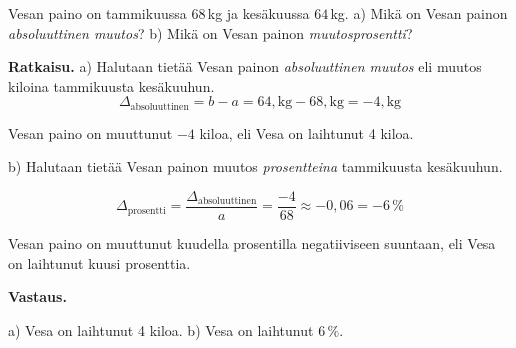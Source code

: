 \begin{esimerkki}
    Vesan paino on tammikuussa $68$\,kg ja kesäkuussa $64$\,kg.
    \newline a) Mikä on Vesan painon \textit{absoluuttinen muutos}?
    \newline b) Mikä on Vesan painon \textit{muutosprosentti}?
    
    \textbf{Ratkaisu.}
a) Halutaan tietää Vesan painon \textit{absoluuttinen muutos} eli muutos kiloina tammikuusta kesäkuuhun.
    \[
       \Delta_{\text{absoluuttinen}} = b - a = 64,\text{kg} - 68,\text{kg} = -4,\text{kg}
    \]

    Vesan paino on muuttunut $-4$ kiloa, eli Vesa on laihtunut 4 kiloa.

b) Halutaan tietää Vesan painon muutos \textit{prosentteina} tammikuusta kesäkuuhun.
    
    \[
        \Delta_{\text{prosentti}}
        = \frac{\Delta_{\text{absoluuttinen}}}{a}
        = \frac{-4}{68}
        \approx -0,06
        = -6\,\% 
    \]
    
    Vesan paino on muuttunut kuudella prosentilla negatiiviseen suuntaan,
    eli Vesa on laihtunut kuusi prosenttia.
    
    \textbf{Vastaus.}
    
a) Vesa on laihtunut 4 kiloa.
b) Vesa on laihtunut $6\,\%$.
\end{esimerkki}

    
